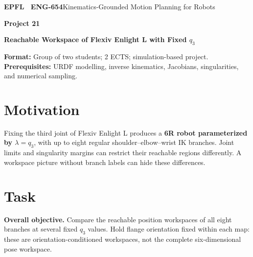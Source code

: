 \documentclass[11pt,a4paper]{article}
\begin{document}
{\small\textbf{EPFL \textbar\ ENG-654}\hfill Kinematics-Grounded Motion Planning for Robots}
\vspace{5mm}

{\color{epflred}\Large\bfseries Project 21}

{\LARGE\bfseries Reachable Workspace of Flexiv Enlight L with Fixed $q_3$\par}

\textbf{Format:} Group of two students; 2 ECTS; simulation-based project.\\
\textbf{Prerequisites:} URDF modelling, inverse kinematics, Jacobians,
singularities, and numerical sampling.

\section*{Motivation}
Fixing the third joint of Flexiv Enlight L produces a
\textbf{6R robot parameterized by $\lambda=q_3$}, with up to eight regular
shoulder--elbow--wrist IK branches. Joint limits and singularity margins can
restrict their reachable regions differently. A workspace picture without
branch labels can hide these differences.

\section*{Task}
\textbf{Overall objective.} Compare the reachable position workspaces of all
eight branches at several fixed $q_3$ values. Hold flange orientation fixed
within each map: these are orientation-conditioned workspaces, not the complete
six-dimensional pose workspace.
\end{document}
